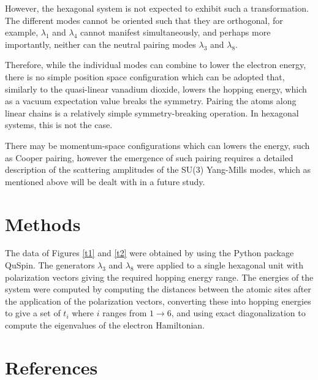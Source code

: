 \documentclass[prb,showpacs,superscriptaddress,titlepage,amsmath,amssymb,twocolumn]{revtex4-1}
\begin{document}
However, the hexagonal system is not expected to exhibit such a transformation. The different modes cannot be oriented such that they are orthogonal, for example, $\lambda_{1}$ and $\lambda_{4}$ cannot manifest simultaneously, and perhaps more importantly, neither can the neutral pairing modes $\lambda_{3}$ and $\lambda_{8}$.

Therefore, while the individual modes can combine to lower the electron energy, there is no simple position space configuration which can be adopted that, similarly to the quasi-linear vanadium dioxide, lowers the hopping energy, which as a vacuum expectation value breaks the symmetry. Pairing the atoms along linear chains is a relatively simple symmetry-breaking operation. In hexagonal systems, this is not the case.

There may be momentum-space configurations which can lowers the energy, such as Cooper pairing, however the emergence of such pairing requires a detailed description of the scattering amplitudes of the SU(3) Yang-Mills modes, which as mentioned above will be dealt with in a future study.

\section{Methods}
The data of Figures \ref{t1} and \ref{t2} were obtained by using the Python package QuSpin\cite{Weinberg2019}. The generators $\lambda_{3}$ and $\lambda_{8}$ were applied to a single hexagonal unit with polarization vectors giving the required hopping energy range. The energies of the system were computed by computing the distances between the atomic sites after the application of the polarization vectors, converting these into hopping energies to give a set of $t_{i}$ where $i$ ranges from $1 \rightarrow 6$, and using exact diagonalization to compute the eigenvalues of the electron Hamiltonian. 
\section{References}


\end{document}
